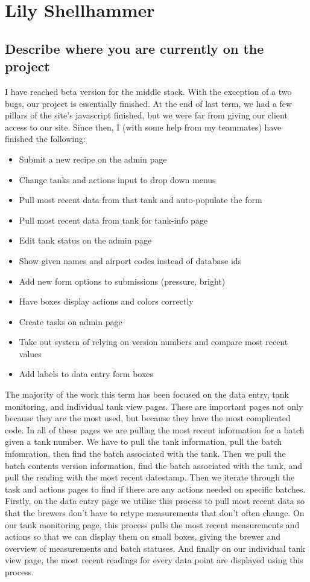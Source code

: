\documentclass[draftclsnofoot,onecolumn,letterpaper,10pt,compsoc]{IEEEtran}
\begin{document}
\section{Lily Shellhammer}
\subsection{Describe where you are currently on the project}
I have reached beta version for the middle stack.
With the exception of a two bugs, our project is essentially finished.
At the end of last term, we had a few pillars of the site's javascript finished, but we were far from giving our client access to our site.
Since then, I (with some help from my teammates) have finished the following:
\begin{itemize}
\item Submit a new recipe on the admin page
\item Change tanks and actions input to drop down menus
\item Pull most recent data from that tank and auto-populate the form
\item Pull most recent data from tank for tank-info page
\item Edit tank status on the admin page
\item Show given names and airport codes instead of database ids
\item Add new form options to submissions (pressure, bright)
\item Have boxes display actions and colors correctly
\item Create tasks on admin page
\item Take out system of relying on version numbers and compare most recent values
\item Add labels to data entry form boxes
\end{itemize}
The majority of the work this term has been focused on the data entry, tank monitoring, and individual tank view pages.
These are important pages not only because they are the most used, but because they have the most complicated code.
In all of these pages we are pulling the most recent information for a batch given a tank number.
We have to pull the tank information, pull the batch infomration, then find the batch associated with the tank.
Then we pull the batch contents version information, find the batch associated with the tank, and pull the reading with the most recent datestamp.
Then we iterate through the task and actions pages to find if there are any actions needed on specific batches.
\\
Firstly, on the data entry page we utilize this process to pull most recent data so that the brewers don't have to retype measurements that don't often change.
On our tank monitoring page, this process pulls the most recent measurements and actions so that we can display them on small boxes, giving the brewer and overview of measurements and batch statuses.
And finally on our individual tank view page, the most recent readings for every data point are displayed using this process.
\\
\end{document}
